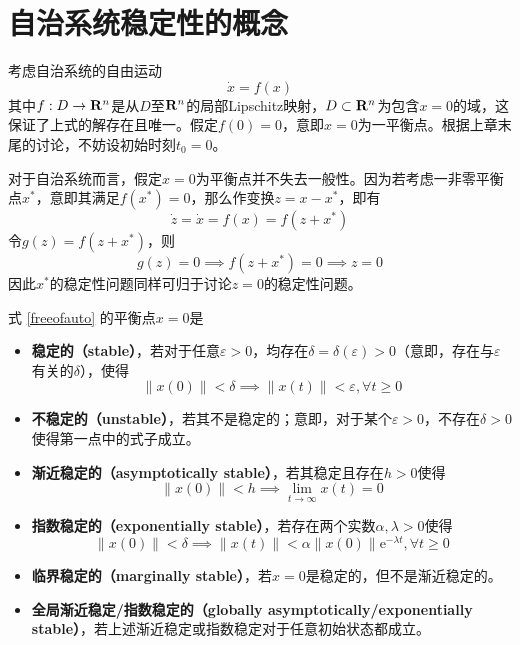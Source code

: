 \section{自治系统稳定性的概念}\label{2Aref}
考虑自治系统的自由运动
\begin{equation}\label{freeofauto}
  \dot{x}=f(x)
\end{equation}
其中$f:D\to\mathbf{R}{}^n$是从$D$至$\mathbf{R}{}^n$的局部Lipschitz映射，$D\subset\mathbf{R}{}^n$为包含$x=0$的域，这保证了上式的解存在且唯一。假定$f(0)=0$，意即$x=0$为一平衡点。根据上章末尾的讨论，不妨设初始时刻$t_0=0$。
\begin{note}
  对于自治系统而言，假定$x=0$为平衡点并不失去一般性。因为若考虑一非零平衡点$x^\ast$，意即其满足$f(x^\ast)=0$，那么作变换$z=x-x^\ast$，即有\[\dot{z}=\dot{x}=f(x)=f(z+x^\ast)\]令$g(z)=f(z+x^\ast)$，则\[g(z)=0\implies f(z+x^\ast)=0\implies z=0\]因此$x^\ast$的稳定性问题同样可归于讨论$z=0$的稳定性问题。
\end{note}
\begin{definition}[自治系统的稳定性]
  式 \eqref{freeofauto} 的平衡点$x=0$是
  \begin{itemize}[leftmargin=1em]
    \item {\bf 稳定的（stable）}，若对于任意$\varepsilon>0$，均存在$\delta=\delta(\varepsilon)>0$（意即，存在与$\varepsilon$有关的$\delta$），使得
    \[\|x(0)\|<\delta\implies \|x(t)\|<\varepsilon,\forall t\ge 0\]
    \item {\bf 不稳定的（unstable）}，若其不是稳定的；意即，对于某个$\varepsilon>0$，不存在$\delta>0$使得第一点中的式子成立。
    \item {\bf 渐近稳定的（asymptotically stable）}，若其稳定且存在$h>0$使得\[\|x(0)\|<h\implies \lim_{t\to\infty}x(t)=0\]
    \item {\bf 指数稳定的（exponentially stable）}，若存在两个实数$\alpha,\lambda>0$使得\[\|x(0)\|<\delta\implies \|x(t)\|<\alpha\|x(0)\|\mathrm{e}^{-\lambda t},\forall t\ge 0\]
    \item {\bf 临界稳定的（marginally stable）}，若$x=0$是稳定的，但不是渐近稳定的。
    \item {\bf 全局渐近稳定/指数稳定的（globally asymptotically/exponentially stable）}，若上述渐近稳定或指数稳定对于任意初始状态都成立。
  \end{itemize}
\end{definition}

